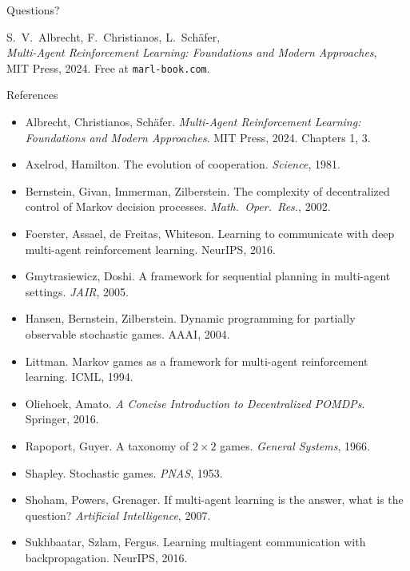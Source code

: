 \documentclass[aspectratio=169,11pt]{beamer}
\begin{document}
\begin{frame}
  \centering
  {\Large Questions?}
  \par\bigskip\bigskip
  {\small S.\ V.\ Albrecht, F.\ Christianos, L.\ Sch\"afer,\\ \emph{Multi-Agent Reinforcement Learning: Foundations and Modern Approaches},\\ MIT Press, 2024. Free at \texttt{marl-book.com}.\par}
\end{frame}


\begin{frame}{References}
  \footnotesize
  \begin{itemize}
    \item Albrecht, Christianos, Sch\"afer. \emph{Multi-Agent Reinforcement Learning: Foundations and Modern Approaches}. MIT Press, 2024. Chapters 1, 3.
    \item Axelrod, Hamilton. The evolution of cooperation. \emph{Science}, 1981.
    \item Bernstein, Givan, Immerman, Zilberstein. The complexity of decentralized control of Markov decision processes. \emph{Math.\ Oper.\ Res.}, 2002.
    \item Foerster, Assael, de Freitas, Whiteson. Learning to communicate with deep multi-agent reinforcement learning. NeurIPS, 2016.
    \item Gmytrasiewicz, Doshi. A framework for sequential planning in multi-agent settings. \emph{JAIR}, 2005.
    \item Hansen, Bernstein, Zilberstein. Dynamic programming for partially observable stochastic games. AAAI, 2004.
    \item Littman. Markov games as a framework for multi-agent reinforcement learning. ICML, 1994.
    \item Oliehoek, Amato. \emph{A Concise Introduction to Decentralized POMDPs}. Springer, 2016.
    \item Rapoport, Guyer. A taxonomy of $2 \times 2$ games. \emph{General Systems}, 1966.
    \item Shapley. Stochastic games. \emph{PNAS}, 1953.
    \item Shoham, Powers, Grenager. If multi-agent learning is the answer, what is the question? \emph{Artificial Intelligence}, 2007.
    \item Sukhbaatar, Szlam, Fergus. Learning multiagent communication with backpropagation. NeurIPS, 2016.
  \end{itemize}
\end{frame}
\end{document}
